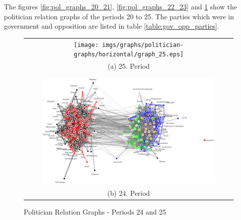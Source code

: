 The figures \ref{fig:pol_graphs_20_21}, \ref{fig:pol_graphs_22_23} and \ref{fig:pol_graphs_24_25} show the politician relation graphs of the periods 20 to 25. The parties which were in government and opposition are listed in table \ref{table:gov_opp_parties}.

\begin{figure}
\center
\begin{tabular}{ c }
	\texttt{[image: imgs/graphs/politician-graphs/horizontal/graph\_25.eps]}
	\\
	(a) 25. Period
	\\
	\\
	\hline
	\\
	\includegraphics[width=0.85\textwidth]{imgs/graphs/politician-graphs/horizontal/graph_24.eps}
	\\
	(b) 24. Period
	
\end{tabular}
	
	
	\caption{Politician Relation Graphs - Periods 24 and 25}
	\label{fig:pol_graphs_24_25}
\end{figure}


